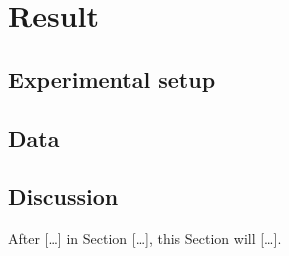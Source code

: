 \section{Result}
\label{sec:Result}
\subsection{Experimental setup}
\subsection{Data}
\subsection{Discussion}

After [\dots] in Section [\dots], this Section will [\dots].

